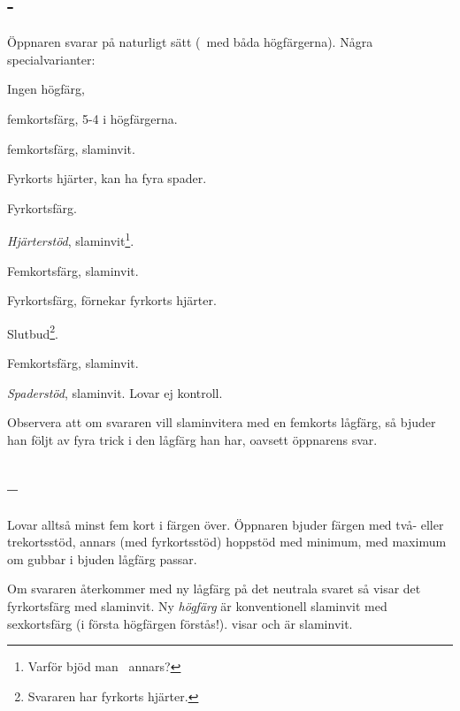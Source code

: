 \subsection{ - }

\"Oppnaren svarar p{\aa} naturligt s\"att (\ med b{\aa}da 
h\"ogf\"argerna). N{\aa}gra spe\-cial\-va\-ri\-an\-ter:

\bbe
   \item[\ru{3}] Ingen h\"ogf\"arg,
     \bbe
       \item[-\ho{3}] femkortsf\"arg, 5-4 i h\"ogf\"argerna.
       \item[-\la{4}] femkortsf\"arg, slaminvit.
      \ebe

   \item[\hj{3}] Fyrkorts hj\"arter, kan ha fyra spader.
     \bbe 
       \item[-\spa{3}] Fyrkortsf\"arg.
       \item[-\NT{3}] {\em Hj\"arterst\"od}, slaminvit\footnote{Varf\"or
                    bj\"od man \ annars?}.
       \item[-\la{4}] Femkortsf\"arg, slaminvit.
      \ebe

    \item[\spa{3}] Fyrkortsf\"arg, f\"ornekar fyrkorts hj\"arter.
      \bbe
        \item[-\NT{3}] Slutbud\footnote{Svararen har fyrkorts hj\"arter.}.
        \item[-\la{4}] Femkortsf\"arg, slaminvit.
        \item[-\hj{4}] {\em Spaderst\"od}\/, slaminvit. Lovar ej kontroll.
       \ebe
\ebe

Observera att om svararen vill slaminvitera med en femkorts l{\aa}gf\"arg,
s{\aa} bjuder han  f\"oljt av fyra trick i den l{\aa}gf\"arg han har,
oavsett \"oppnarens svar.

\subsection{--}

Lovar allts{\aa} minst fem kort i f\"argen \"over. \"Oppnaren bjuder
f\"argen med tv{\aa}- eller trekortsst\"od, annars (med fyrkortsst\"od)
hoppst\"od med minimum,  med maximum om gubbar i bjuden l{\aa}gf\"arg
passar.

Om svararen {\aa}terkommer med ny l{\aa}gf\"arg p{\aa} det neutrala svaret
 s{\aa} visar det fyrkortsf\"arg med slaminvit. Ny {\em h\"ogf\"arg} \"ar
konventionell slaminvit med sexkortsf\"arg (i f\"orsta h\"ogf\"argen
 f\"orst{\aa}s!).  visar  och \"ar slaminvit.

